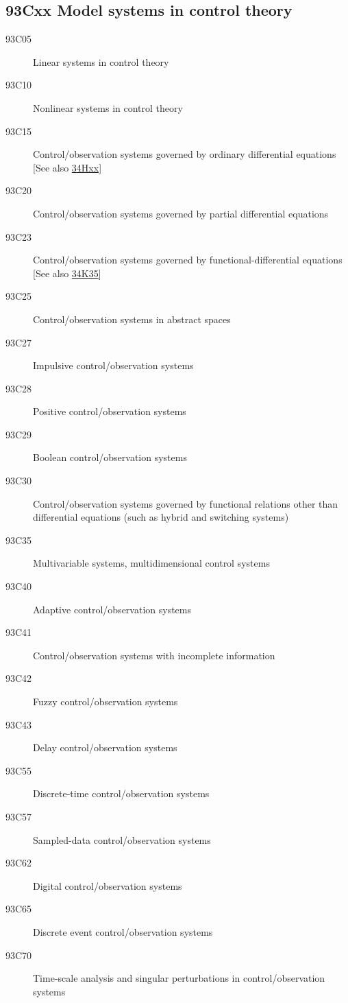 \documentclass[letterpaper]{article}
\begin{document}
\subsection*{93Cxx  Model systems in control theory}\label{93Cxx}
\begin{description}  
\item [93C05]\label{93C05} Linear systems in control theory
\item [93C10]\label{93C10} Nonlinear systems in control theory
\item [93C15]\label{93C15} Control/observation systems governed by ordinary differential equations [See also \hyperref[34Hxx]{34Hxx}]
\item [93C20]\label{93C20} Control/observation systems governed by partial differential equations
\item [93C23]\label{93C23} Control/observation systems governed by functional-differential equations [See also \hyperref[34K35]{34K35}]
\item [93C25]\label{93C25} Control/observation systems in abstract spaces
\item [93C27]\label{93C27} Impulsive control/observation systems
\item [93C28]\label{93C28} Positive control/observation systems
\item [93C29]\label{93C29} Boolean control/observation systems
\item [93C30]\label{93C30} Control/observation systems governed by functional relations other than differential equations (such as hybrid and switching systems)
\item [93C35]\label{93C35} Multivariable systems, multidimensional control systems
\item [93C40]\label{93C40} Adaptive control/observation systems
\item [93C41]\label{93C41} Control/observation systems with incomplete information
\item [93C42]\label{93C42} Fuzzy control/observation systems
\item [93C43]\label{93C43} Delay control/observation systems
\item [93C55]\label{93C55} Discrete-time control/observation systems
\item [93C57]\label{93C57} Sampled-data control/observation systems
\item [93C62]\label{93C62} Digital control/observation systems
\item [93C65]\label{93C65} Discrete event control/observation  systems
\item [93C70]\label{93C70} Time-scale analysis and singular perturbations in control/observation systems

\end{description}
\end{document}
